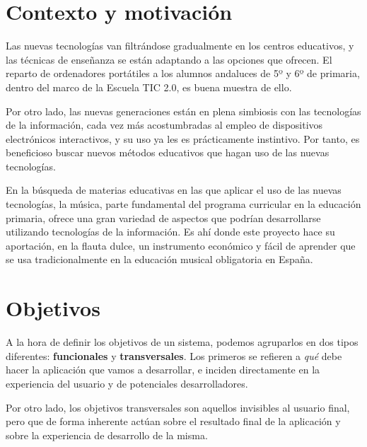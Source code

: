 \section{Contexto y motivación}
Las nuevas tecnologías van filtrándose gradualmente en los centros
educativos, y las técnicas de enseñanza se están adaptando a las
opciones que ofrecen. El reparto de ordenadores portátiles a los
alumnos andaluces de 5º y 6º de primaria, dentro del marco de la
Escuela TIC 2.0, es buena muestra de ello. 

Por otro lado, las nuevas generaciones están en plena simbiosis con las
tecnologías de la información, cada vez más acostumbradas al empleo de
dispositivos electrónicos interactivos, y su uso ya les es prácticamente
instintivo. Por tanto, es beneficioso buscar nuevos métodos educativos que hagan
uso de las nuevas tecnologías.

En la búsqueda de materias educativas en las que aplicar el uso de las nuevas
tecnologías, la música, parte fundamental del programa curricular en la
educación primaria, ofrece una gran variedad de aspectos que podrían
desarrollarse utilizando tecnologías de la información. Es ahí donde este
proyecto hace su aportación, en la flauta dulce, un instrumento económico y
fácil de aprender que se usa tradicionalmente en la educación musical
obligatoria en España.

\section{Objetivos}
A la hora de definir los objetivos de un sistema, podemos agruparlos
en dos tipos diferentes: \textbf{funcionales} y
\textbf{transversales}. Los primeros se refieren a \textit{qué} debe
hacer la aplicación que vamos a desarrollar, e inciden
directamente en la experiencia del usuario y de potenciales
desarrolladores.

Por otro lado, los objetivos transversales son aquellos invisibles al
usuario final, pero que de forma inherente actúan sobre el resultado
final de la aplicación y sobre la experiencia de desarrollo de la misma.

